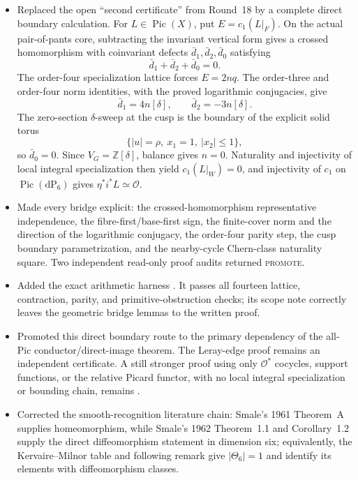 \begin{itemize}[leftmargin=1.8em]
\item Replaced the open ``second certificate'' from Round~18 by a complete
direct boundary calculation.  For $L\in\operatorname{Pic}(X)$, put
$E=c_1(L|_F)$.  On the actual pair-of-pants core, subtracting the invariant
vertical form gives a crossed homomorphism with coinvariant defects
$\bar d_1,\bar d_2,\bar d_0$ satisfying
\[
 \bar d_1+\bar d_2+\bar d_0=0.
\]
The order-four specialization lattice forces $E=2nq$.  The order-three and
order-four norm identities, with the proved logarithmic conjugacies, give
\[
 \bar d_1=4n[\delta],\qquad
 \bar d_2=-3n[\delta].
\]
The zero-section $\widehat\delta$-sweep at the cusp is the boundary of the
explicit solid torus
\[
 \{|u|=\rho,\ x_1=1,\ |x_2|\le1\},
\]
so $\bar d_0=0$.  Since $V_G=\mathbb Z[\delta]$, balance gives $n=0$.
Naturality and injectivity of local integral specialization then yield
$c_1(L|_W)=0$, and injectivity of $c_1$ on
$\operatorname{Pic}(\mathrm{dP}_6)$ gives
$\eta^*i^*L\simeq\mathcal O$.
\item Made every bridge explicit: the crossed-homomorphism representative
independence, the fibre-first/base-first sign, the finite-cover norm and the
direction of the logarithmic conjugacy, the order-four parity step, the cusp
boundary parametrization, and the nearby-cycle Chern-class naturality
square.  Two independent read-only proof audits returned \textsc{promote}.
\item Added the exact arithmetic harness
.
It passes all fourteen lattice, contraction, parity, and primitive-obstruction
checks; its scope note correctly leaves the geometric bridge lemmas to the
written proof.
\item Promoted this direct boundary route to the primary dependency of the
all-Pic conductor/direct-image theorem.  The Leray-edge proof remains an
independent certificate.  A still stronger proof using only
$\mathcal O^*$ cocycles, support functions, or the relative Picard functor,
with no local integral specialization or bounding chain, remains \Open.
\item Corrected the smooth-recognition literature chain: Smale's 1961
Theorem~A supplies homeomorphism, while Smale's 1962 Theorem~1.1 and
Corollary~1.2 supply the direct diffeomorphism statement in dimension six;
equivalently, the Kervaire--Milnor table and following remark give
$|\Theta_6|=1$ and identify its elements with diffeomorphism classes.
\end{itemize}

